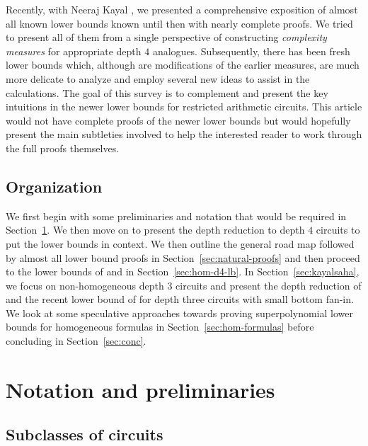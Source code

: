 \documentclass[12pt]{report}
\begin{document}
Recently, with Neeraj Kayal  \cite{KayalRP}, we presented a comprehensive exposition of almost all known lower bounds known until then with nearly complete proofs. We tried to present all of them from a single perspective of constructing \emph{complexity measures} for appropriate depth $4$ analogues. Subsequently, there has been fresh lower bounds which, although are modifications of the earlier measures, are much more delicate to analyze and employ several new ideas to assist in the calculations. The goal of this survey is to complement \cite{KayalRP} and present the key intuitions in the newer lower bounds for restricted arithmetic circuits. This article would not have complete proofs of the newer lower bounds but would hopefully present the main subtleties involved to help the interested reader to work through the full proofs themselves. 

\subsection*{Organization}

We first begin with some preliminaries and notation that would be required in Section~\ref{sec:notation}. We then move on to present the depth reduction to depth $4$ circuits to put the lower bounds in context. We then outline the general road map followed by almost all lower bound proofs in Section~\ref{sec:natural-proofs} and then proceed to the lower bounds of \cite{KLSS} and \cite{KS14} in Section~\ref{sec:hom-d4-lb}. In Section~\ref{sec:kayalsaha}, we focus on non-homogeneous depth $3$ circuits and present the depth reduction of \cite{gkks13b} and the recent lower bound of \cite{KayalSaha14} for depth three circuits with small bottom fan-in. We look at some speculative approaches towards proving superpolynomial lower bounds for homogeneous formulas in Section~\ref{sec:hom-formulas} before concluding in Section~\ref{sec:conc}. 


\section{Notation and preliminaries}\label{sec:notation}

\subsection{Subclasses of circuits}
\end{document}

